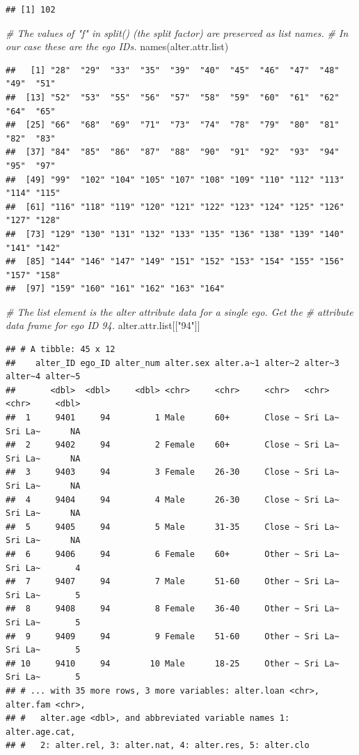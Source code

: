 \documentclass[
]{book}
\newenvironment{Shaded}{\begin{snugshade}}{\end{snugshade}}
\newcommand{\CommentTok}[1]{\textcolor[rgb]{0.56,0.35,0.01}{\textit{#1}}}
\newcommand{\FunctionTok}[1]{\textcolor[rgb]{0.00,0.00,0.00}{#1}}
\newcommand{\NormalTok}[1]{#1}
\newcommand{\StringTok}[1]{\textcolor[rgb]{0.31,0.60,0.02}{#1}}
\begin{document}
\begin{verbatim}
## [1] 102
\end{verbatim}

\begin{Shaded}
\begin{Highlighting}[]
\CommentTok{\# The values of "f" in split() (the split factor) are preserved as list names.}
\CommentTok{\# In our case these are the ego IDs.}
\FunctionTok{names}\NormalTok{(alter.attr.list)}
\end{Highlighting}
\end{Shaded}

\begin{verbatim}
##   [1] "28"  "29"  "33"  "35"  "39"  "40"  "45"  "46"  "47"  "48"  "49"  "51" 
##  [13] "52"  "53"  "55"  "56"  "57"  "58"  "59"  "60"  "61"  "62"  "64"  "65" 
##  [25] "66"  "68"  "69"  "71"  "73"  "74"  "78"  "79"  "80"  "81"  "82"  "83" 
##  [37] "84"  "85"  "86"  "87"  "88"  "90"  "91"  "92"  "93"  "94"  "95"  "97" 
##  [49] "99"  "102" "104" "105" "107" "108" "109" "110" "112" "113" "114" "115"
##  [61] "116" "118" "119" "120" "121" "122" "123" "124" "125" "126" "127" "128"
##  [73] "129" "130" "131" "132" "133" "135" "136" "138" "139" "140" "141" "142"
##  [85] "144" "146" "147" "149" "151" "152" "153" "154" "155" "156" "157" "158"
##  [97] "159" "160" "161" "162" "163" "164"
\end{verbatim}

\begin{Shaded}
\begin{Highlighting}[]
\CommentTok{\# The list element is the alter attribute data for a single ego. Get the}
\CommentTok{\# attribute data frame for ego ID 94.}
\NormalTok{alter.attr.list[[}\StringTok{"94"}\NormalTok{]]}
\end{Highlighting}
\end{Shaded}

\begin{verbatim}
## # A tibble: 45 x 12
##    alter_ID ego_ID alter_num alter.sex alter.a~1 alter~2 alter~3 alter~4 alter~5
##       <dbl>  <dbl>     <dbl> <chr>     <chr>     <chr>   <chr>   <chr>     <dbl>
##  1     9401     94         1 Male      60+       Close ~ Sri La~ Sri La~      NA
##  2     9402     94         2 Female    60+       Close ~ Sri La~ Sri La~      NA
##  3     9403     94         3 Female    26-30     Close ~ Sri La~ Sri La~      NA
##  4     9404     94         4 Male      26-30     Close ~ Sri La~ Sri La~      NA
##  5     9405     94         5 Male      31-35     Close ~ Sri La~ Sri La~      NA
##  6     9406     94         6 Female    60+       Other ~ Sri La~ Sri La~       4
##  7     9407     94         7 Male      51-60     Other ~ Sri La~ Sri La~       5
##  8     9408     94         8 Female    36-40     Other ~ Sri La~ Sri La~       5
##  9     9409     94         9 Female    51-60     Other ~ Sri La~ Sri La~       5
## 10     9410     94        10 Male      18-25     Other ~ Sri La~ Sri La~       5
## # ... with 35 more rows, 3 more variables: alter.loan <chr>, alter.fam <chr>,
## #   alter.age <dbl>, and abbreviated variable names 1: alter.age.cat,
## #   2: alter.rel, 3: alter.nat, 4: alter.res, 5: alter.clo
\end{verbatim}
\end{document}
